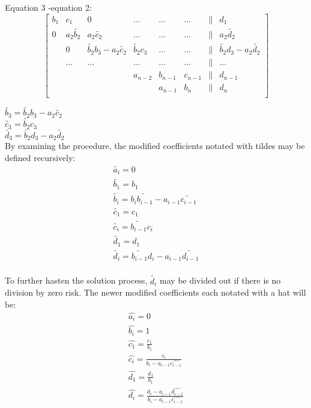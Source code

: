 Equation 3 -equation 2: \\

\[
\begin{bmatrix}
     b_1 & c_1                   & 0     & \dots    & \dots   & \dots    & \| & d_1 \\
     0   & a_2 \tilde{b_2} & a_2 \tilde{c_2}   & \dots    & \dots   & \dots    & \| & a_2 \tilde{d_2} \\
         & 0                   & \tilde{b_2} b_3 - a_2 \tilde{c_2}  & \tilde{b_2} c_3      & \dots   & \dots    & \| & \tilde{b_2} d_3 - a_2 \tilde{d_2}\\
         & \dots                 & \dots & \dots    & \dots   & \dots    & \| & \dots \\
         &                       &       & a_{n-2}  & b_{n-1} & c_{n-1}  & \| & d_{n-1} \\
         &                       &       &          & a_{n-1} & b_n      & \| & d_n \\
\end{bmatrix}  
\]

$\tilde{b_3} = \tilde{b_2} b_3 - a_2 \tilde{c_2}$ \\
$\tilde{c_3} = \tilde{b_2} c_3$ \\
$\tilde{d_3} = \tilde{b_2} d_3 - a_2 \tilde{d_2}$ \\

By examining the procedure, the modified coefficients notated with tildes may be defined recursively:\\

\begin{gather*}
	\tilde{a_i} = 0 \\
	\tilde{b_1} = b_1 \\
	\tilde{b_i} = b_i \tilde{b_{i-1}} - a_{i-1} \tilde{c_{i-1}} \\
	\tilde{c_1} = c_1 \\
	\tilde{c_i} = \tilde{b_{i-1}} c_i \\
	\tilde{d_1} = d_1  \\
	\tilde{d_i} = \tilde{b_{i-1}} d_i - a_{i-1} \tilde{d_{i-1}} \\
\end{gather*}

To further hasten the solution process, $\tilde{d_i}$ may be divided out if there is no division by zero risk. The newer modified coefficients each notated with a hat will be:\\

\begin{gather*}
	\hat{a_i} = 0 \\
	\hat{b_i} = 1 \\
	\hat{c_1} = \frac{c_1}{b_1} \\
	\hat{c_i} = \frac{c_i}{b_i - a_{i-1} \hat{c_{i-1}}} \\
	\hat{d_1} = \frac{d_1}{b_1}  \\
	\hat{d_i} = \frac{ d_i - a_{i-1} \hat{d_{i-1}}}{b_i - a_{i-1} \hat{c_{i-1}}} \\
\end{gather*}

